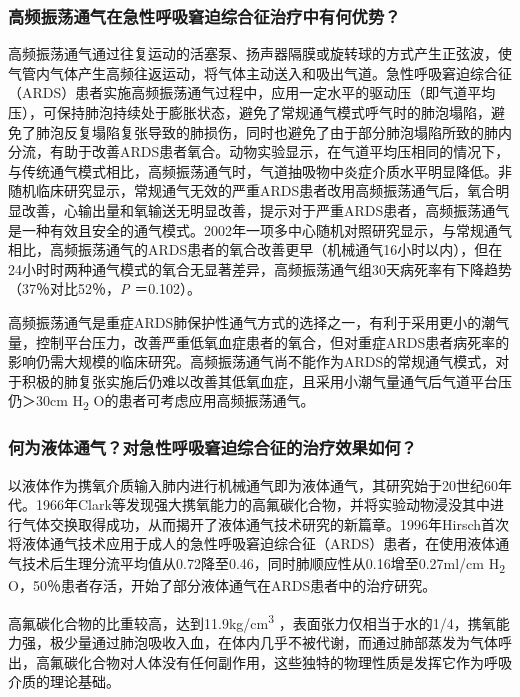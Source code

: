 \subsubsection{高频振荡通气在急性呼吸窘迫综合征治疗中有何优势？}

高频振荡通气通过往复运动的活塞泵、扬声器隔膜或旋转球的方式产生正弦波，使气管内气体产生高频往返运动，将气体主动送入和吸出气道。急性呼吸窘迫综合征（ARDS）患者实施高频振荡通气过程中，应用一定水平的驱动压（即气道平均压），可保持肺泡持续处于膨胀状态，避免了常规通气模式呼气时的肺泡塌陷，避免了肺泡反复塌陷复张导致的肺损伤，同时也避免了由于部分肺泡塌陷所致的肺内分流，有助于改善ARDS患者氧合。动物实验显示，在气道平均压相同的情况下，与传统通气模式相比，高频振荡通气时，气道抽吸物中炎症介质水平明显降低。非随机临床研究显示，常规通气无效的严重ARDS患者改用高频振荡通气后，氧合明显改善，心输出量和氧输送无明显改善，提示对于严重ARDS患者，高频振荡通气是一种有效且安全的通气模式。2002年一项多中心随机对照研究显示，与常规通气相比，高频振荡通气的ARDS患者的氧合改善更早（机械通气16小时以内），但在24小时时两种通气模式的氧合无显著差异，高频振荡通气组30天病死率有下降趋势（37％对比52％，\emph{P}
＝0.102）。

高频振荡通气是重症ARDS肺保护性通气方式的选择之一，有利于采用更小的潮气量，控制平台压力，改善严重低氧血症患者的氧合，但对重症ARDS患者病死率的影响仍需大规模的临床研究。高频振荡通气尚不能作为ARDS的常规通气模式，对于积极的肺复张实施后仍难以改善其低氧血症，且采用小潮气量通气后气道平台压仍＞30cm
H\textsubscript{2} O的患者可考虑应用高频振荡通气。

\subsubsection{何为液体通气？对急性呼吸窘迫综合征的治疗效果如何？}

以液体作为携氧介质输入肺内进行机械通气即为液体通气，其研究始于20世纪60年代。1966年Clark等发现强大携氧能力的高氟碳化合物，并将实验动物浸没其中进行气体交换取得成功，从而揭开了液体通气技术研究的新篇章。1996年Hirsch首次将液体通气技术应用于成人的急性呼吸窘迫综合征（ARDS）患者，在使用液体通气技术后生理分流平均值从0.72降至0.46，同时肺顺应性从0.16增至0.27ml/cm
H\textsubscript{2}
O，50％患者存活，开始了部分液体通气在ARDS患者中的治疗研究。

高氟碳化合物的比重较高，达到11.9kg/cm\textsuperscript{3}
，表面张力仅相当于水的1/4，携氧能力强，极少量通过肺泡吸收入血，在体内几乎不被代谢，而通过肺部蒸发为气体呼出，高氟碳化合物对人体没有任何副作用，这些独特的物理性质是发挥它作为呼吸介质的理论基础。

